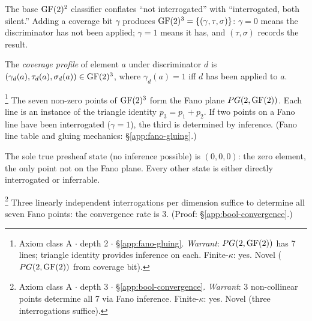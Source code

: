 The base $\operatorname{GF}(2)^2$ classifier conflates
``not interrogated'' with ``interrogated, both silent.''
Adding a coverage bit $\gamma$ produces
$\operatorname{GF}(2)^3 = \{(\gamma, \tau, \sigma)\}$: $\gamma = 0$
means the discriminator has not been applied; $\gamma = 1$
means it has, and $(\tau, \sigma)$ records the result.

\begin{definition}\label{def:coverage}
The \emph{coverage profile} of element $a$ under
discriminator $d$ is
$(\gamma_d(a), \tau_d(a), \sigma_d(a)) \in \operatorname{GF}(2)^3$,
where $\gamma_d(a) = 1$ iff $d$ has been applied to $a$.
\end{definition}

\begin{theorem}\label{thm:fano}\footnote{Axiom class \textsf{A} $\cdot$ depth 2 $\cdot$ \S\ref{app:fano-gluing}.  \emph{Warrant}: $PG(2, \operatorname{GF}(2))$ has 7 lines; triangle identity provides inference on each. Finite-$\kappa$: yes. Novel ($PG(2, \operatorname{GF}(2))$ from coverage bit).}
The seven non-zero points of $\operatorname{GF}(2)^3$ form the Fano
plane $PG(2, \operatorname{GF}(2))$. Each line is an instance of the
triangle identity $p_3 = p_1 + p_2$. If two points on a
Fano line have been interrogated ($\gamma = 1$), the
third is determined by inference.
(Fano line table and gluing mechanics:
\S\ref{app:fano-gluing}.)
\end{theorem}

\begin{corollary}\label{cor:self-model}
The sole true presheaf state (no inference possible) is
$(0,0,0)$: the zero element, the only point not on the
Fano plane. Every other state is either directly
interrogated or inferrable.
\end{corollary}

\begin{theorem}\label{thm:convergence}\footnote{Axiom class \textsf{A} $\cdot$ depth 3 $\cdot$ \S\ref{app:bool-convergence}.  \emph{Warrant}: 3 non-collinear points determine all 7 via Fano inference. Finite-$\kappa$: yes. Novel (three interrogations suffice).}
Three linearly independent interrogations per dimension
suffice to determine all seven Fano points: the
convergence rate is $3$.
(Proof: \S\ref{app:bool-convergence}.)
\end{theorem}
